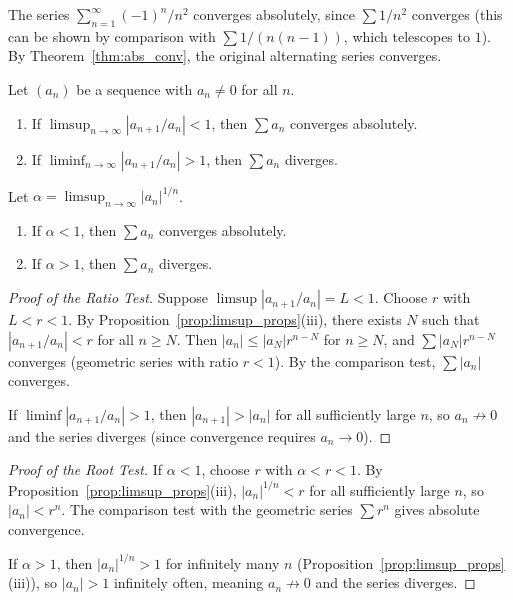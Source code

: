 \documentclass[11pt,a4paper]{article}
\begin{document}
\begin{example}
\label{ex:abs_conv}
The series $\sum_{n=1}^\infty (-1)^n / n^2$ converges absolutely, since
$\sum 1/n^2$ converges (this can be shown by comparison with
$\sum 1/(n(n-1))$, which telescopes to $1$). By
Theorem~\ref{thm:abs_conv}, the original alternating series converges.
\end{example}

\begin{keyresult}[title={Ratio and Root Tests}]
\begin{theorem}
\label{thm:ratio}
Let $(a_n)$ be a sequence with $a_n \neq 0$ for all $n$.
\begin{enumerate}[nosep,label=(\roman*)]
  \item If $\limsup_{n\to\infty} |a_{n+1}/a_n| < 1$, then $\sum a_n$
    converges absolutely.
  \item If $\liminf_{n\to\infty} |a_{n+1}/a_n| > 1$, then $\sum a_n$
    diverges.
\end{enumerate}
\end{theorem}
\begin{theorem}
\label{thm:root}
Let $\alpha = \limsup_{n\to\infty} |a_n|^{1/n}$.
\begin{enumerate}[nosep,label=(\roman*)]
  \item If $\alpha < 1$, then $\sum a_n$ converges absolutely.
  \item If $\alpha > 1$, then $\sum a_n$ diverges.
\end{enumerate}
\end{theorem}
\end{keyresult}

\begin{proof}[Proof of the Ratio Test]
Suppose $\limsup |a_{n+1}/a_n| = L < 1$. Choose $r$ with $L < r < 1$.
By Proposition~\ref{prop:limsup_props}(iii), there exists $N$ such that
$|a_{n+1}/a_n| < r$ for all $n \ge N$. Then $|a_n| \le |a_N| r^{n-N}$
for $n \ge N$, and $\sum |a_N| r^{n-N}$ converges (geometric series
with ratio $r < 1$). By the comparison test, $\sum |a_n|$ converges.

If $\liminf |a_{n+1}/a_n| > 1$, then $|a_{n+1}| > |a_n|$ for all
sufficiently large $n$, so $a_n \not\to 0$ and the series diverges
(since convergence requires $a_n \to 0$).
\end{proof}

\begin{proof}[Proof of the Root Test]
If $\alpha < 1$, choose $r$ with $\alpha < r < 1$. By
Proposition~\ref{prop:limsup_props}(iii), $|a_n|^{1/n} < r$ for all
sufficiently large $n$, so $|a_n| < r^n$. The comparison test with the
geometric series $\sum r^n$ gives absolute convergence.

If $\alpha > 1$, then $|a_n|^{1/n} > 1$ for infinitely many $n$
(Proposition~\ref{prop:limsup_props}(iii)), so $|a_n| > 1$ infinitely
often, meaning $a_n \not\to 0$ and the series diverges.
\end{proof}
\end{document}
